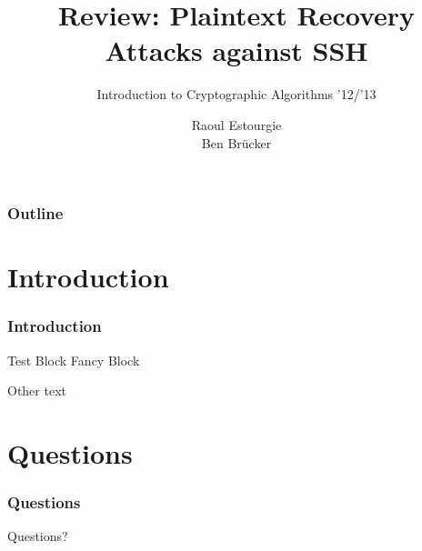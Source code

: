 \documentclass[fleqn]{beamer}
\title[Plaintext Recovery Attacks against SSH]{
Review: Plaintext Recovery Attacks against SSH}
\subtitle{Introduction to Cryptographic Algorithms '12/'13}
\author[Estourgie \& Br\"ucker]{
Raoul Estourgie\\
Ben Br\"ucker}
\institute[Radboud University Nijmegen]{
  Institute for Computing and Information Sciences \\
  Radboud University Nijmegen}
\date[Presentation 5-4-2013]
\begin{document}
  \begin{frame}
    \titlepage
  \end{frame}

  \begin{frame}
    \frametitle{Outline}
    \tableofcontents
  \end{frame}
  
\section{Introduction}

  \begin{frame}
    \frametitle{Introduction}
	\begin{block}{Test Block}
	Fancy Block
	\end{block}
	Other text
  \end{frame}

\section{Questions}

  \begin{frame}
    \frametitle{Questions}
    \begin{center}
    Questions?
    \end{center}
  \end{frame}
\end{document}
